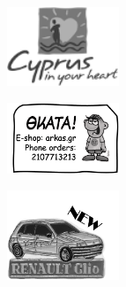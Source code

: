 \begin{multimuons-2}[enhanced, tikz={rotate=0}]{}
    \begin{multicols*}{3}
      \begin{figure}
        \begin{center}
          \vspace{-0.2in}
          \leavevmode
          \includegraphics[width=0.3\textwidth]{./figures/cyprus.png}
        \end{center}
      \end{figure}
      \columnbreak
      \begin{figure}
        \begin{center}
          \vspace{-0.2in}
          \leavevmode
          \includegraphics[width=0.3\textwidth]{./figures/thkata.png}
        \end{center}
      \end{figure}
      \columnbreak
      \begin{figure}
        \begin{center}
          \vspace{-0.2in}
          \leavevmode
          \includegraphics[width=0.3\textwidth]{./figures/car.png}
        \end{center}
      \end{figure}
    \end{multicols*}
  \end{multimuons-2}